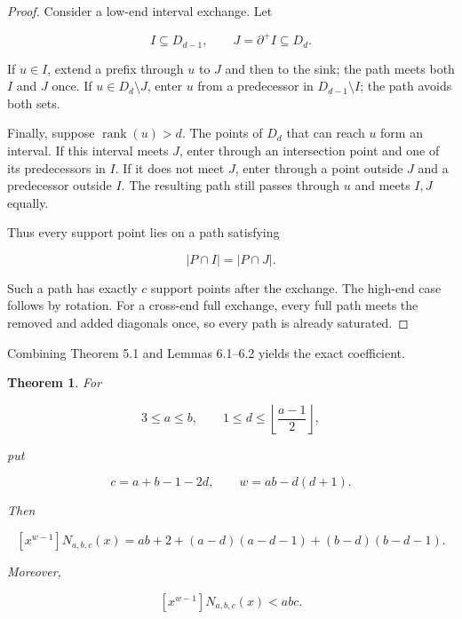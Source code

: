 \documentclass[11pt]{article}
\newtheorem{theorem}{Theorem}[section]
\numberwithin{equation}{section}
\begin{document}
\begin{proof}

Consider a low-end interval exchange. Let

\nopagebreak[4]
\[
I\subseteq D_{d-1},
\qquad
J=\partial^+I\subseteq D_d.
\]

If $u\in I$, extend a prefix through $u$ to $J$ and then to the sink; the
path meets both $I$ and $J$ once. If $u\in D_d\setminus J$, enter $u$ from
a predecessor in $D_{d-1}\setminus I$; the path avoids both sets.

Finally, suppose $\operatorname{rank}(u)>d$. The points of $D_d$ that can
reach $u$ form an interval. If this interval meets $J$, enter through an
intersection point and one of its predecessors in $I$. If it does not meet
$J$, enter through a point outside $J$ and a predecessor outside $I$. The
resulting path still passes through $u$ and meets $I,J$ equally.

Thus every support point lies on a path satisfying

\nopagebreak[4]
\[
|P\cap I|=|P\cap J|.
\]

Such a path has exactly $c$ support points after the exchange. The high-end
case follows by rotation. For a cross-end full exchange, every full path
meets the removed and added diagonals once, so every path is already
saturated.
\end{proof}


Combining Theorem 5.1 and Lemmas 6.1--6.2 yields the exact coefficient.

\Needspace{0.25\textheight}
\begin{theorem}

For

\nopagebreak[4]
\[
3\le a\le b,\qquad
1\le d\le\left\lfloor\frac{a-1}{2}\right\rfloor,
\]

put

\nopagebreak[4]
\[
c=a+b-1-2d,\qquad w=ab-d(d+1).
\]

Then

\nopagebreak[4]
\[
\boxed{
[x^{w-1}]N_{a,b,c}(x)
=ab+2+(a-d)(a-d-1)+(b-d)(b-d-1).
}
\tag{6.2}
\]

Moreover,

\nopagebreak[4]
\[
[x^{w-1}]N_{a,b,c}(x)<abc.
\tag{6.3}
\]

\end{theorem}
\end{document}
